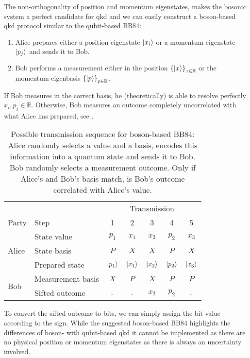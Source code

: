 The non-orthogonality of position and momentum eigenstates, makes the bosonic system a perfect candidate for \gls{qkd} and we can easily construct a boson-based \gls{qkd} protocol similar to the qubit-based BB84:
\begin{enumerate}
	\item Alice prepares either a position eigenstate $\ket{x_i}$ or a momentum eigenstate $\ket{p_j}$ and sends it to Bob.
	\item Bob performs a measurement either in the position $\left\{\ket{x}\right\}_{x\in\mathbb{R}}$ or the momentum eigenbasis $\left\{\ket{p}\right\}_{p\in\mathbb{R}}$.
\end{enumerate}
If Bob measures in the correct basis, he (theoretically) is able to resolve perfectly $x_i,p_j\in\mathbb{R}$.
Otherwise, Bob measures an outcome completely uncorrelated with what Alice has prepared, see .
\begin{table}[htb]
	\centering
	\begin{tabular}{llccccc}
		\toprule
		& & \multicolumn{5}{c}{Transmission} \\
		\cmidrule{3-7}
		Party & Step & 1 & 2 & 3 & 4 & 5 \\ 
		\midrule
		\multirow{3}{*}{Alice} & State value & $p_1$ & $x_1$ & $x_2$ & $p_2$ & $x_3$ \\
		& State basis & $P$ & $X$ & $X$ & $P$ & $X$ \\
		& Prepared state & $\ket{p_1}$ & $\ket{x_1}$ & $\ket{x_2}$ & $\ket{p_2}$ & $\ket{x_3}$ \\
		\cmidrule{1-1}
		\multirow{2}{*}{Bob} & Measurement basis & $X$ & $P$ & $X$ & $P$ & $P$ \\
		& Sifted outcome & - & - & $x_2$ & $p_2$ & - \\
		\bottomrule
	\end{tabular}
	\caption{Possible transmission sequence for boson-based BB84: Alice randomly selects a value and a basis, encodes this information into a quantum state and sends it to Bob. Bob randomly selects a measurement outcome. Only if Alice's and Bob's basis match, is Bob's outcome correlated with Alice's value.}\label{tab:boson_transmission_sequence}
\end{table}
To convert the sifted outcome to bits, we can simply assign the bit value according to the sign.
While the suggested boson-based BB84 highlights the differences of boson- with qubit-based \gls{qkd} it cannot be implemented as there are no physical position or momentum eigenstates as there is always an uncertainty involved.

